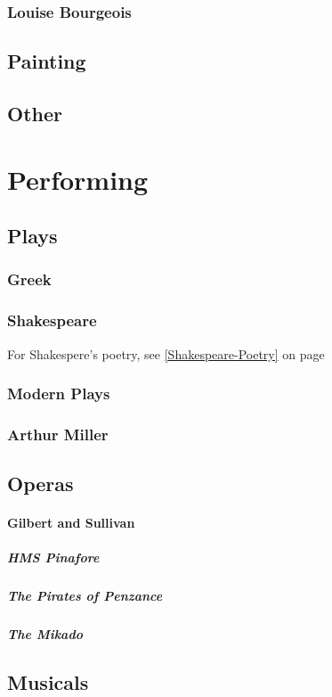 			\subsubsection{Louise Bourgeois}
			
		\subsection{Painting}
		\subsection{Other}

	\section{Performing}
		\subsection{Plays}
			\subsubsection{Greek}
			\subsubsection{Shakespeare} \label{Shakespeare-Play} For Shakespere's poetry, see \ref{Shakespeare-Poetry} on page 
			\subsubsection{Modern Plays}
			\subsubsection{Arthur Miller}
			
			
		\subsection{Operas}
		
		
		
		\paragraph{Gilbert and Sullivan}
			\subparagraph{HMS Pinafore}
			\subparagraph{The Pirates of Penzance}
			\subparagraph{The Mikado}
		\subsection{Musicals}

